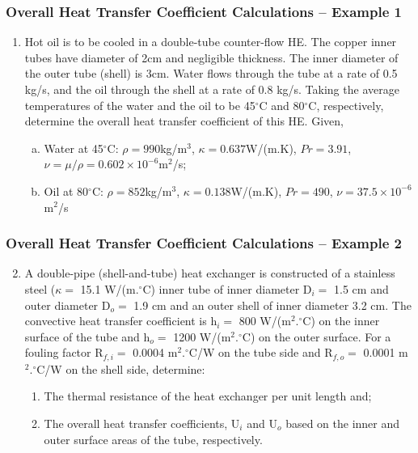 \documentclass[10pt,compress,unknownkeysallowed]{beamer}
\begin{document}
\begin{frame}
  \frametitle{Overall Heat Transfer Coefficient Calculations -- Example 1}
     \begin{enumerate}
          \item Hot oil is to be cooled in a double-tube counter-flow HE. The copper inner tubes have diameter of 2cm and negligible thickness. The inner diameter of the outer tube (shell) is 3cm. Water flows through the tube at a rate of 0.5 kg/s, and the oil through the shell at a rate of 0.8 kg/s. Taking the average temperatures of the water and the oil to be 45$^{\circ}$C and 80$^{\circ}$C, respectively, determine the overall heat transfer coefficient of this HE. Given, 
       \begin{enumerate}[(a)]
          \item Water at 45$^{\circ}$C: $\rho=990$kg/m$^{3}$, $\kappa=0.637$W/(m.K), $Pr=3.91$, $\nu=\mu/\rho=0.602\times 10^{-6}$m$^{2}$/s; 
          \item Oil at 80$^{\circ}$C: $\rho=852$kg/m$^{3}$, $\kappa=0.138$W/(m.K), $Pr=490$, $\nu=37.5\times 10^{-6}$m$^{2}$/s
       \end{enumerate}
     \end{enumerate}

\end{frame}


\begin{frame}
  \frametitle{Overall Heat Transfer Coefficient Calculations -- Example 2}
     \begin{enumerate}\setcounter{enumi}{1}
          \item A double-pipe (shell-and-tube) heat exchanger is constructed of a stainless steel ($\kappa=$ 15.1 W/(m.$^{\circ}$C) inner tube of inner diameter D$_{i}=$ 1.5 cm and outer diameter D$_{o}=$ 1.9 cm and an outer shell of inner diameter 3.2 cm. The convective heat transfer coefficient is h$_{i}=$ 800 W/(m$^{2}.^{\circ}$C) on the inner surface of the tube and h$_{o}=$ 1200 W/(m$^{2}.^{\circ}$C) on the outer surface. For a fouling factor R$_{f,i}=$ 0.0004 m$^{2}.^{\circ}$C/W on the tube side and R$_{f,o}=$ 0.0001 m$^{2}.^{\circ}$C/W on the shell side, determine:
              \begin{enumerate}
                  \item The thermal resistance of the heat exchanger per unit length and; 
                  \item The overall heat transfer coefficients, U$_{i}$ and U$_{o}$ based on the inner and outer surface areas of the tube, respectively.
              \end{enumerate}

     \end{enumerate}

\end{frame}
\end{document}
